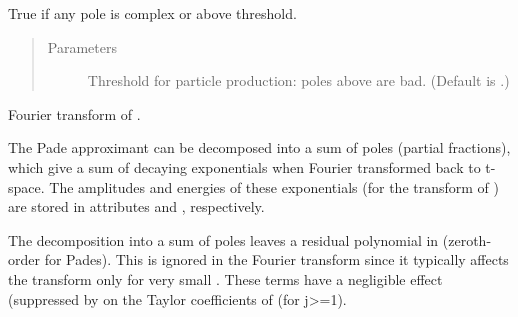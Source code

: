 \documentclass[letterpaper,10pt,english]{sphinxmanual}
\begin{document}
\begin{fulllineitems}

\begin{fulllineitems}
\label{\detokenize{g2tools:g2tools.vacpol.badpoles}}
True if any pole is complex or above threshold.
\begin{quote}\begin{description}
\item[{Parameters}] \leavevmode
{} \textendash{} Threshold for particle production: poles above 
are bad. (Default is .)

\end{description}\end{quote}

\end{fulllineitems}


\begin{fulllineitems}
\label{\detokenize{g2tools:g2tools.vacpol.FT}}
Fourier transform of .

The Pade approximant can be decomposed into a sum of poles (partial
fractions), which give a sum of decaying exponentials when Fourier
transformed back to t-space. The amplitudes and energies of these
exponentials (for the transform of ) are stored in
{\hyperref[\detokenize{g2tools:g2tools.vacpol}]{}} attributes  and , respectively.

The decomposition into a sum of poles leaves a residual polynomial in
 (zeroth-order for  Pades). This is ignored in the
Fourier transform since it typically affects the transform only for
very small . These terms have a negligible effect (suppressed by
 on the Taylor coefficients  of 
(for j\textgreater{}=1).


\end{fulllineitems}
\end{fulllineitems}
\end{document}
